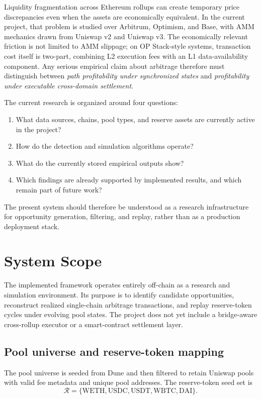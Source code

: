 \documentclass[11pt]{article}
\begin{document}
Liquidity fragmentation across Ethereum rollups can create temporary price discrepancies even when the assets are economically equivalent. In the current project, that problem is studied over Arbitrum, Optimism, and Base, with AMM mechanics drawn from Uniswap v2 and Uniswap v3. The economically relevant friction is not limited to AMM slippage; on OP Stack-style systems, transaction cost itself is two-part, combining L2 execution fees with an L1 data-availability component. Any serious empirical claim about arbitrage therefore must distinguish between \emph{path profitability under synchronized states} and \emph{profitability under executable cross-domain settlement}.

The current research is organized around four questions:
\begin{enumerate}[label=\arabic*.]
    \item What data sources, chains, pool types, and reserve assets are currently active in the project?
    \item How do the detection and simulation algorithms operate?
    \item What do the currently stored empirical outputs show?
    \item Which findings are already supported by implemented results, and which remain part of future work?
\end{enumerate}

The present system should therefore be understood as a research infrastructure for opportunity generation, filtering, and replay, rather than as a production deployment stack.

\section{System Scope}

The implemented framework operates entirely off-chain as a research and simulation environment. Its purpose is to identify candidate opportunities, reconstruct realized single-chain arbitrage transactions, and replay reserve-token cycles under evolving pool states. The project does not yet include a bridge-aware cross-rollup executor or a smart-contract settlement layer.

\subsection{Pool universe and reserve-token mapping}

The pool universe is seeded from Dune and then filtered to retain Uniswap pools with valid fee metadata and unique pool addresses. The reserve-token seed set is
\[
\mathcal{R} = \{\mathrm{WETH},\mathrm{USDC},\mathrm{USDT},\mathrm{WBTC},\mathrm{DAI}\}.
\]
\end{document}

